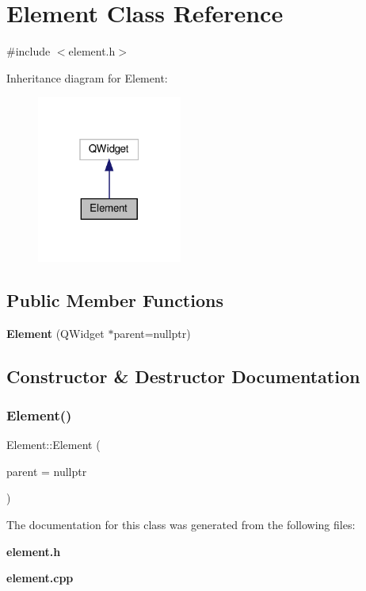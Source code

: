 \section{Element Class Reference}
\label{classElement}


{\ttfamily \#include $<$element.\+h$>$}



Inheritance diagram for Element\+:
\nopagebreak
\begin{figure}[H]
\begin{center}
\leavevmode
\includegraphics[width=135pt]{classElement__inherit__graph}
\end{center}
\end{figure}
\subsection*{Public Member Functions}
\begin{DoxyCompactItemize}
\item 
\textbf{ Element} (Q\+Widget $\ast$parent=nullptr)
\end{DoxyCompactItemize}


\subsection{Constructor \& Destructor Documentation}
\mbox{\label{classElement_a13abe7d029dbf66dac43fca1ae8f23ee}} 
\subsubsection{Element()}
{\footnotesize\ttfamily Element\+::\+Element (\begin{DoxyParamCaption}\item[{Q\+Widget $\ast$}]{parent = {\ttfamily nullptr} }\end{DoxyParamCaption})\hspace{0.3cm}{\ttfamily [explicit]}}



The documentation for this class was generated from the following files\+:\begin{DoxyCompactItemize}
\item 
\textbf{ element.\+h}\item 
\textbf{ element.\+cpp}\end{DoxyCompactItemize}
